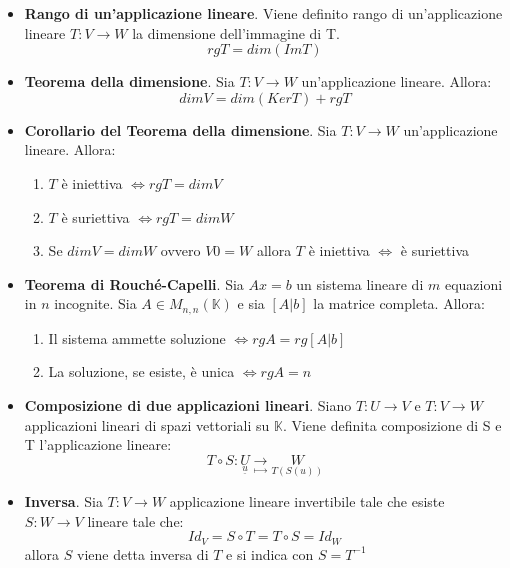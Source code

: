 \documentclass[12pt,a4paper,oneside]{book}
\begin{document}
\begin{itemize}
\item \textbf{Rango di un'applicazione lineare}. \linebreak
	  Viene definito rango di un'applicazione lineare $T:V\rightarrow W$ la dimensione dell'immagine
	  di T. \hfill
	  $$rgT=dim(ImT)$$
	
\item \textbf{Teorema della dimensione}. \linebreak
	  Sia $T:V\rightarrow W$ un'applicazione lineare. Allora: $$dimV=dim(KerT) + rgT$$
	
\item \textbf{Corollario del Teorema della dimensione}. \linebreak
	  Sia $T:V\rightarrow W$ un'applicazione lineare. Allora:
	  
	  \begin{enumerate}
	  \item $T$ è iniettiva $\Leftrightarrow rgT = dimV$
	  \item $T$ è suriettiva $\Leftrightarrow rgT = dimW$
	  \item Se $dimV=dimW$ ovvero $V0=W$ allora $T$ è iniettiva $\Leftrightarrow$ è suriettiva
	  \end{enumerate}
	
\item \textbf{Teorema di Rouché-Capelli}. \linebreak
	  Sia $Ax=b$ un sistema lineare di $m$ equazioni in $n$ incognite. Sia $A\in M_{n, n}(\mathbb{K})$ e
	  sia $[A|b]$ la matrice completa. Allora:
	  
	  \begin{enumerate}
	  \item Il sistema ammette soluzione $\Leftrightarrow rgA=rg[A|b]$
	  \item La soluzione, se esiste, è unica $\Leftrightarrow rgA = n$
	  \end{enumerate}
	
\item \textbf{Composizione di due applicazioni lineari}. \linebreak
	  Siano $T:U\rightarrow V$ e $T:V\rightarrow W$ applicazioni lineari di spazi vettoriali su $\mathbb{K}
	  $.
	  \hfill \break Viene definita composizione di S e T l'applicazione lineare:
	  $$T\circ S : \underset{\underline{u}}{U} \underset{\longmapsto}{\rightarrow}
	  \underset{T(S(u))}{W}$$
	
\item \textbf{Inversa}. \linebreak
	  Sia $T:V\rightarrow W$ applicazione lineare invertibile tale che esiste $S:W\rightarrow V$ lineare 
	  tale che: $$Id_V = S\circ T = T\circ S = Id_W$$ allora $S$ viene detta inversa di $T$ e si indica con 
	  $S= T^{-1}$

\end{itemize}
\end{document}
